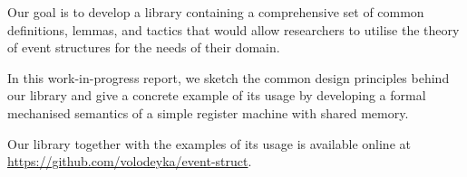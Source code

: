 Our goal is to develop a \coq library containing 
a comprehensive set of common definitions, lemmas, 
and tactics that would allow researchers 
to utilise the theory of event structures 
for the needs of their domain.

In this work-in-progress report, we sketch 
the common design principles behind our library
and give a concrete example of its usage  
by developing a formal mechanised semantics of a simple 
register machine with shared memory.

Our library together with the examples of 
its usage is available online at \url{https://github.com/volodeyka/event-struct}.  
